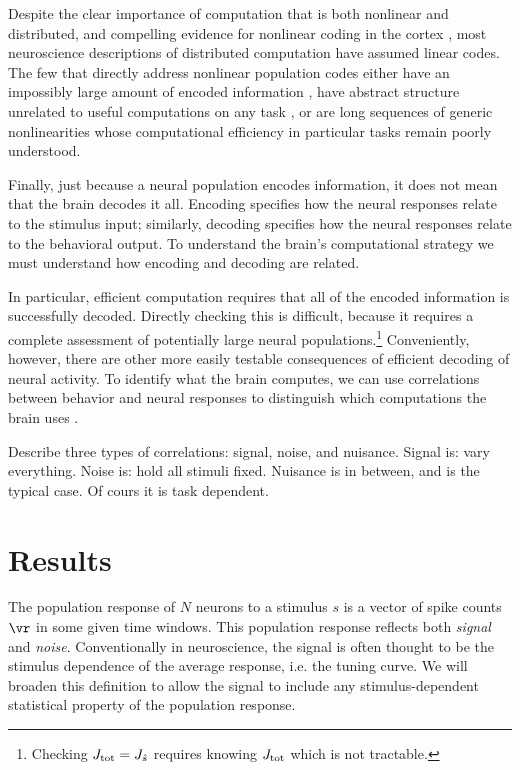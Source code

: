 \documentclass[11pt,twocolumn]{article}
\begin{document}
Despite the clear importance of computation that is both nonlinear and distributed, and compelling evidence for  nonlinear coding in the cortex \cite{kohn2005stimulus,averbeck2006effects,ohiorhenuan2010sparse}, most neuroscience descriptions of distributed computation have assumed linear codes. The few that directly address nonlinear population codes either have an impossibly large amount of encoded information \cite{shamir2006implications,ecker}, have abstract structure unrelated to useful computations on any task \cite{babadi2014sparseness}, or are long sequences of generic nonlinearities \cite{riesenhuber1999hierarchical,anselmi2013unsupervised,dicarlo2007untangling,yamins2014performance} whose computational efficiency in particular tasks remain poorly understood.

Finally, just because a neural population encodes information, it does not mean that the brain decodes it all. Encoding specifies how the neural responses relate to the stimulus input; similarly, decoding specifies how the neural responses relate to the behavioral output. To understand the brain's computational strategy we must understand how encoding and decoding are related.

In particular, efficient computation requires that all of the encoded information is successfully decoded. Directly checking this is difficult, because it requires a complete assessment of potentially large neural populations.\footnote{Checking $J_{\rm tot}=J_{\hat{s}}$ requires knowing $J_{\rm tot}$ which is not tractable.} Conveniently, however, there are other more easily testable consequences of efficient decoding of neural activity. To identify what the brain computes, we can use correlations between behavior and neural responses to distinguish which computations the brain uses \cite{haefner2013inferring,pitkowHow}.


Describe three types of correlations: signal, noise, and nuisance. Signal is: vary everything. Noise is: hold all stimuli fixed. Nuisance is in between, and is the typical case. Of cours it is task dependent.



\section{Results}

The population response of $N$ neurons to a stimulus $s$ is a vector of spike counts $\vr$ in some given time windows. This population response reflects both {\it signal} and {\it noise}. Conventionally in neuroscience, the signal is often thought to be the stimulus dependence of the average response, i.e. the tuning curve. We will broaden this definition to allow the signal to include any stimulus-dependent statistical property of the population response.
\end{document}
